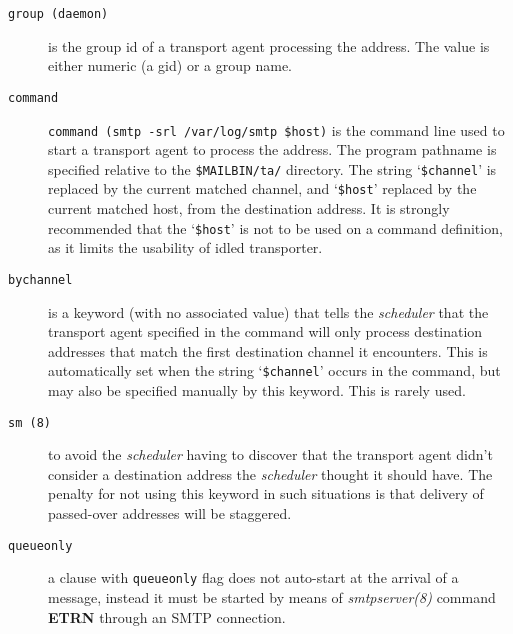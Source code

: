 \begin{description}
\item[{\tt group (daemon)}] \mbox{}

is the group id of a transport agent processing 
the address. The value is either numeric (a gid) or a group name.



\item[{\tt command}] \mbox{}

{\tt command (smtp -srl /var/log/smtp \$host)} 
is the command line used to start a transport agent to process the address.
The program pathname is specified relative to the {\tt \$MAILBIN/ta/}
directory. The string `{\tt \$channel}' is replaced by the current
matched channel, and `{\tt \$host}' replaced by the current matched 
host, from the destination address. It is strongly recommended that the 
`{\tt \$host}' is not to be used on a command definition, as it limits 
the usability of idled transporter.



\item[{\tt bychannel}] \mbox{}

is a keyword (with no associated value) that tells 
the {\em scheduler\/} that the transport agent specified in the command will 
only process destination addresses that match the first destination channel it 
encounters. This is automatically set when the string `{\tt \$channel}' 
occurs in the command, but may also be specified manually by this keyword. 
This is rarely used.



\item[{\tt sm (8)}] \mbox{}

to avoid the {\em scheduler\/} having to discover that 
the transport agent didn't consider a destination address the {\em scheduler\/}
thought it should have. The penalty for not using this keyword in such situations 
is that delivery of passed-over addresses will be staggered.



\item[{\tt queueonly}] \mbox{}

a clause with {\tt queueonly} flag does not auto-start 
at the arrival of a message, instead it must be started by means of 
{\em smtpserver(8)\/} command {\bf ETRN} through an SMTP connection.



\end{description}



